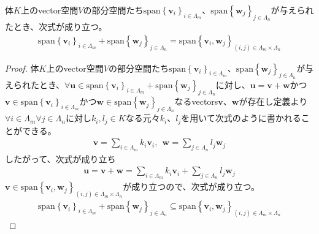 \documentclass[dvipdfmx]{jsarticle}
\begin{document}
\begin{thm}\label{2.1.9.2}
体$K$上のvector空間$V$の部分空間たち${\mathrm{span}}\left\{ \mathbf{v}_{i} \right\}_{i \in \varLambda_{m}}$、${\mathrm{span}}\left\{ \mathbf{w}_{j} \right\}_{j \in \varLambda_{n}}$が与えられたとき、次式が成り立つ。
\begin{align*}
{\mathrm{span}}\left\{ \mathbf{v}_{i} \right\}_{i \in \varLambda_{m}} + {\mathrm{span}}\left\{ \mathbf{w}_{j} \right\}_{j \in \varLambda_{n}} = {\mathrm{span}}\left\{ \mathbf{v}_{i},\mathbf{w}_{j} \right\}_{(i,j) \in \varLambda_{m} \times \varLambda_{n}}
\end{align*}
\end{thm}
\begin{proof}
体$K$上のvector空間$V$の部分空間たち${\mathrm{span}}\left\{ \mathbf{v}_{i} \right\}_{i \in \varLambda_{m}}$、${\mathrm{span}}\left\{ \mathbf{w}_{j} \right\}_{j \in \varLambda_{n}}$が与えられたとき、$\forall\mathbf{u} \in {\mathrm{span}}\left\{ \mathbf{v}_{i} \right\}_{i \in \varLambda_{m}} + {\mathrm{span}}\left\{ \mathbf{w}_{j} \right\}_{j \in \varLambda_{n}}$に対し、$\mathbf{u} = \mathbf{v} + \mathbf{w}$かつ$\mathbf{v} \in {\mathrm{span}}\left\{ \mathbf{v}_{i} \right\}_{i \in \varLambda_{m}}$かつ$\mathbf{w} \in {\mathrm{span}}\left\{ \mathbf{w}_{j} \right\}_{j \in \varLambda_{n}}$なるvectors$\mathbf{v}$、$\mathbf{w}$が存在し定義より$\forall i \in \varLambda_{m}\forall j \in \varLambda_{n}$に対し$k_{i},l_{j} \in K$なる元々$k_{i}$、$l_{j}$を用いて次式のように書かれることができる。
\begin{align*}
\mathbf{v} = \sum_{i \in \varLambda_{m}} {k_{i}\mathbf{v}_{i}},\ \ \mathbf{w} = \sum_{j \in \varLambda_{n}} {l_{j}\mathbf{w}_{j}}
\end{align*}
したがって、次式が成り立ち
\begin{align*}
\mathbf{u} = \mathbf{v} + \mathbf{w} = \sum_{i \in \varLambda_{m}} {k_{i}\mathbf{v}_{i}} + \sum_{j \in \varLambda_{n}} {l_{j}\mathbf{w}_{j}}
\end{align*}
$\mathbf{v} \in {\mathrm{span}}\left\{ \mathbf{v}_{i},\mathbf{w}_{j} \right\}_{(i,j) \in \varLambda_{m} \times \varLambda_{n}}$が成り立つので、次式が成り立つ。
\begin{align*}
{\mathrm{span}}\left\{ \mathbf{v}_{i} \right\}_{i \in \varLambda_{m}} + {\mathrm{span}}\left\{ \mathbf{w}_{j} \right\}_{j \in \varLambda_{n}} \subseteq {\mathrm{span}}\left\{ \mathbf{v}_{i},\mathbf{w}_{j} \right\}_{(i,j) \in \varLambda_{m} \times \varLambda_{n}}
\end{align*}\par

\end{proof}
\end{document}

